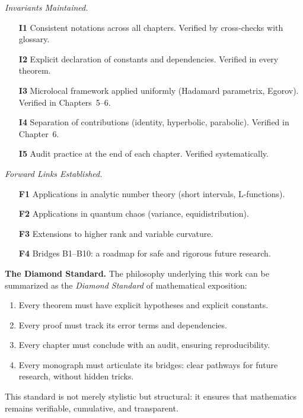 \medskip
\noindent\textit{Invariants Maintained.}
\begin{itemize}
  \item[\textbf{I1}] Consistent notations across all chapters. Verified by cross-checks with glossary.
  \item[\textbf{I2}] Explicit declaration of constants and dependencies. Verified in every theorem.
  \item[\textbf{I3}] Microlocal framework applied uniformly (Hadamard parametrix, Egorov). Verified in Chapters~5–6.
  \item[\textbf{I4}] Separation of contributions (identity, hyperbolic, parabolic). Verified in Chapter~6.
  \item[\textbf{I5}] Audit practice at the end of each chapter. Verified systematically.
\end{itemize}

\medskip
\noindent\textit{Forward Links Established.}
\begin{itemize}
  \item[\textbf{F1}] Applications in analytic number theory (short intervals, L-functions). \\
  \item[\textbf{F2}] Applications in quantum chaos (variance, equidistribution). \\
  \item[\textbf{F3}] Extensions to higher rank and variable curvature. \\
  \item[\textbf{F4}] Bridges B1–B10: a roadmap for safe and rigorous future research.
\end{itemize}

\medskip
\noindent\textbf{The Diamond Standard.}
The philosophy underlying this work can be summarized as the \emph{Diamond Standard} of mathematical exposition:
\begin{enumerate}
  \item Every theorem must have explicit hypotheses and explicit constants.
  \item Every proof must track its error terms and dependencies.
  \item Every chapter must conclude with an audit, ensuring reproducibility.
  \item Every monograph must articulate its bridges: clear pathways for future research, without hidden tricks.
\end{enumerate}
This standard is not merely stylistic but structural: it ensures that mathematics remains verifiable, cumulative, and transparent.


